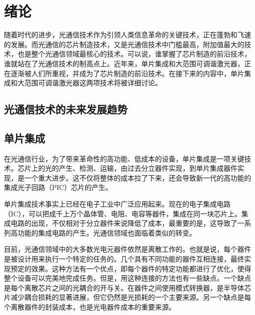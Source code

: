 \documentclass[oneside]{ZJUthesis}
\begin{document}
\ZJUcontents

\ZJUmainmatter

\chapter{绪论}

随着时代的进步，光通信技术作为引领人类信息革命的关键技术，正在蓬勃和飞速的发展。而光通信的芯片制造技术，又是光通信技术中门槛最高，附加值最大的技术，也是整个光通信领域最核心的技术。可以说，谁掌握了芯片制造的前沿技术，谁就站在了光通信技术的制高点上。近年来，单片集成和大范围可调谐激光器，正在逐渐被人们所重视，并成为了芯片制造的前沿技术。在接下来的内容中，单片集成和大范围可调谐激光器这两项技术将被详细讨论。

\section{光通信技术的未来发展趋势}

\section{单片集成}

在光通信行业，为了带来革命性的高功能、低成本的设备，单片集成是一项关键技术。芯片上的光的产生、检测、运输，由过去分立器件实现，到单片集成器件实现，是一个重大进步。这不仅将整体的成本拉了下来，还会导致新一代的高功能的集成光子回路（PIC）芯片的产生。

单片集成技术事实上已经在电子工业中广泛应用起来。现在的电子集成电路（IC），可以把成千上万个晶体管、电阻、电容等器件，集成在同一块芯片上。集成电路的出现，不仅相对于分立器件来说降低了成本，最重要的是，这导致了一系列高功能的集成电路的产生。光通信领域也面临着类似的转变。

目前，光通信领域中的大多数光电元器件依然是离散工作的。也就是说，每个器件是被设计用来执行一个特定的任务的。几个具有不同功能的器件互相连接，最终实现预定的效果。这种方法有一个优点，即每个器件的特定功能都进行了优化，使得整个设备可以完美地完成任务。但是，用这种连接的方法也有一些缺点。一个缺点是每个离散芯片之间的光耦合的开与关。在器件之间使用模式转换器，是半导体芯片减少耦合损耗的显著进展，但它仍然是光损耗的一个主要来源。另一个缺点是每个离散器件的封装成本，也是光电器件成本的重要来源。
\end{document}
